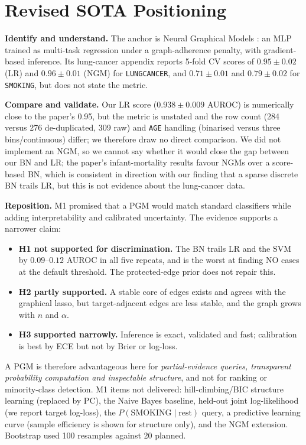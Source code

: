 \documentclass[10pt,twocolumn,letterpaper]{article}
\renewcommand{\_}{\textunderscore\hspace{0pt}}
\newcommand{\V}[1]{{\texttt{\footnotesize #1}}}
\begin{document}
\section{Revised SOTA Positioning}
\textbf{Identify and understand.} The anchor is Neural Graphical Models \cite{ngm}: an MLP trained as multi-task regression under a graph-adherence penalty, with gradient-based inference. Its lung-cancer appendix reports 5-fold CV scores of $0.95\pm0.02$ (LR) and $0.96\pm0.01$ (NGM) for \V{LUNG\_CANCER}, and $0.71\pm0.01$ and $0.79\pm0.02$ for \V{SMOKING}, but does not state the metric.

\textbf{Compare and validate.} Our LR score ($0.938\pm0.009$ AUROC) is numerically close to the paper's 0.95, but the metric is unstated and the row count (284 versus 276 de-duplicated, 309 raw) and \V{AGE} handling (binarised versus three bins/continuous) differ; we therefore draw no direct comparison. We did not implement an NGM, so we cannot say whether it would close the gap between our BN and LR; the paper's infant-mortality results favour NGMs over a score-based BN, which is consistent in direction with our finding that a sparse discrete BN trails LR, but this is not evidence about the lung-cancer data.

\textbf{Reposition.} M1 promised that a PGM would match standard classifiers while adding interpretability and calibrated uncertainty. The evidence supports a narrower claim:
\begin{itemize}
\item \textbf{H1 not supported for discrimination.} The BN trails LR and the SVM by $0.09$--$0.12$ AUROC in all five repeats, and is the worst at finding NO cases at the default threshold. The protected-edge prior does not repair this.
\item \textbf{H2 partly supported.} A stable core of edges exists and agrees with the graphical lasso, but target-adjacent edges are less stable, and the graph grows with $n$ and $\alpha$.
\item \textbf{H3 supported narrowly.} Inference is exact, validated and fast; calibration is best by ECE but not by Brier or log-loss.
\end{itemize}
A PGM is therefore advantageous here for \emph{partial-evidence queries, transparent probability computation and inspectable structure}, and not for ranking or minority-class detection. M1 items not delivered: hill-climbing/BIC structure learning (replaced by PC), the Naive Bayes baseline, held-out joint log-likelihood (we report target log-loss), the $P(\text{SMOKING}\mid\text{rest})$ query, a predictive learning curve (sample efficiency is shown for structure only), and the NGM extension. Bootstrap used 100 resamples against 20 planned.
\end{document}
